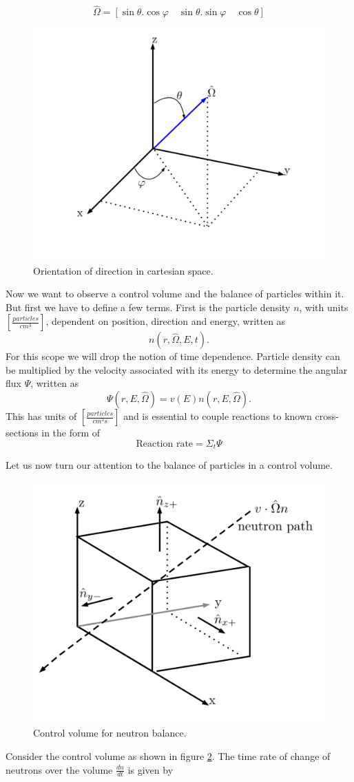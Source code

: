 \documentclass[11pt,letterpaper,titlepage]{article}
\numberwithin{equation}{section}
\begin{document}
$$\hat{\Omega} = [\sin \theta . \cos \varphi \quad \sin \theta . \sin \varphi \quad \cos \theta]$$

\begin{figure}[h]
\centering
\includegraphics[width=0.5\linewidth]{Figures/PositionOmega}
\caption{Orientation of direction in cartesian space.}
\label{fig:positionomega}
\end{figure}

Now we want to observe a control volume and the balance of particles within it. But first we have to define a few terms. First is the particle density $n$, with units $[\frac{particles}{cm^3}]$, dependent on position, direction and energy, written as
$$n(r,\hat{\Omega},E,t).$$
\noindent For this scope we will drop the notion of time dependence. Particle density can be multiplied by the velocity associated with its energy to determine the angular flux $\Psi$, written as
$$
\Psi (r,E,\hat{\Omega}) = v(E) n(r,E,\hat{\Omega}).
$$
\noindent This has units of $[\frac{particles}{cm^2 s}]$ and is essential to couple reactions to known cross-sections in the form of
$$\text{Reaction rate}=\Sigma_t \Psi$$

\noindent Let us now turn our attention to the balance of particles in a control volume.
\newpage


\begin{figure}[h]
    \centering
    \includegraphics[width=0.4\linewidth]{Figures/ControlVolume}
    \caption{Control volume for neutron balance.}
    \label{fig:controlvolume}
\end{figure}
\noindent
Consider the control volume as shown in figure \ref{fig:controlvolume}. The time rate of change of neutrons over the volume $\frac{dn}{dt}$ is given by
\end{document}
